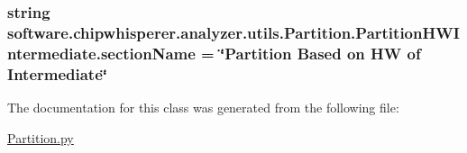 \subsubsection[{section\+Name}]{\setlength{\rightskip}{0pt plus 5cm}string software.\+chipwhisperer.\+analyzer.\+utils.\+Partition.\+Partition\+H\+W\+Intermediate.\+section\+Name = \char`\"{}Partition Based on H\+W of Intermediate\char`\"{}\hspace{0.3cm}{\ttfamily [static]}}\label{classsoftware_1_1chipwhisperer_1_1analyzer_1_1utils_1_1Partition_1_1PartitionHWIntermediate_a2d76aa327194477fd5fedfb325696a37}


The documentation for this class was generated from the following file\+:\begin{DoxyCompactItemize}
\item 
\hyperlink{Partition_8py}{Partition.\+py}\end{DoxyCompactItemize}
